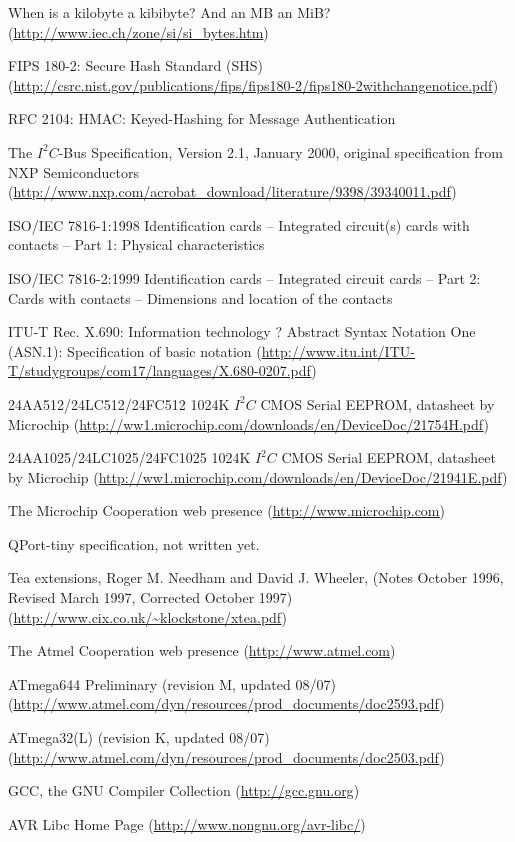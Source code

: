 \documentclass[10pt,a4paper]{article}
\begin{document}
\begin{thebibliography}{999}
 When is a kilobyte a kibibyte? And an MB an MiB? (\url{http://www.iec.ch/zone/si/si_bytes.htm})

 FIPS 180-2: Secure Hash Standard (SHS) (\url{http://csrc.nist.gov/publications/fips/fips180-2/fips180-2withchangenotice.pdf})
 
 RFC 2104: HMAC: Keyed-Hashing for Message Authentication

 The $I^2C$-Bus Specification, Version 2.1, January 2000, original specification from NXP Semiconductors (\url{http://www.nxp.com/acrobat_download/literature/9398/39340011.pdf})
 
 ISO/IEC 7816-1:1998 Identification cards -- Integrated circuit(s) cards with contacts -- Part 1: Physical characteristics

 ISO/IEC 7816-2:1999 Identification cards -- Integrated circuit cards -- Part 2: Cards with contacts -- Dimensions and location of the contacts

 ITU-T Rec. X.690: Information technology ? Abstract Syntax Notation One (ASN.1): Specification of basic notation (\url{http://www.itu.int/ITU-T/studygroups/com17/languages/X.680-0207.pdf})

  24AA512/24LC512/24FC512 1024K $I^2C$ CMOS Serial EEPROM, datasheet by Microchip (\url{http://ww1.microchip.com/downloads/en/DeviceDoc/21754H.pdf})

  24AA1025/24LC1025/24FC1025 1024K $I^2C$ CMOS Serial EEPROM, datasheet by Microchip (\url{http://ww1.microchip.com/downloads/en/DeviceDoc/21941E.pdf})

 The Microchip Cooperation web presence (\url{http://www.microchip.com})

 QPort-tiny specification, not written yet.

 Tea extensions, Roger M. Needham and David J. Wheeler, (Notes October 1996, Revised March 1997,      Corrected October 1997) (\url{http://www.cix.co.uk/~klockstone/xtea.pdf})

 The Atmel Cooperation web presence (\url{http://www.atmel.com})  

 ATmega644 Preliminary (revision M, updated 08/07)  (\url{http://www.atmel.com/dyn/resources/prod_documents/doc2593.pdf})

 ATmega32(L) (revision K, updated 08/07)  (\url{http://www.atmel.com/dyn/resources/prod_documents/doc2503.pdf})

 GCC, the GNU Compiler Collection (\url{http://gcc.gnu.org})
 
 AVR Libc Home Page (\url{http://www.nongnu.org/avr-libc/})
\end{thebibliography}
\end{document}
